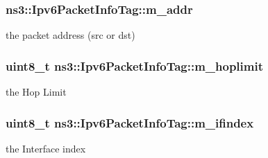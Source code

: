 \subsubsection[{\texorpdfstring{m\+\_\+addr}{m_addr}}]{ ns3\+::\+Ipv6\+Packet\+Info\+Tag\+::m\+\_\+addr\hspace{0.3cm}{\ttfamily [private]}}\hypertarget{classns3_1_1Ipv6PacketInfoTag_a483b85ae4e7fa24395b53ed02b36c646}{}\label{classns3_1_1Ipv6PacketInfoTag_a483b85ae4e7fa24395b53ed02b36c646}


the packet address (src or dst) 

\subsubsection[{\texorpdfstring{m\+\_\+hoplimit}{m_hoplimit}}]{\setlength{\rightskip}{0pt plus 5cm}uint8\+\_\+t ns3\+::\+Ipv6\+Packet\+Info\+Tag\+::m\+\_\+hoplimit\hspace{0.3cm}{\ttfamily [private]}}\hypertarget{classns3_1_1Ipv6PacketInfoTag_acf8109982da2ac881894047f6b14e30d}{}\label{classns3_1_1Ipv6PacketInfoTag_acf8109982da2ac881894047f6b14e30d}


the Hop Limit 

\subsubsection[{\texorpdfstring{m\+\_\+ifindex}{m_ifindex}}]{\setlength{\rightskip}{0pt plus 5cm}uint8\+\_\+t ns3\+::\+Ipv6\+Packet\+Info\+Tag\+::m\+\_\+ifindex\hspace{0.3cm}{\ttfamily [private]}}\hypertarget{classns3_1_1Ipv6PacketInfoTag_a9093a526d9b0ac774a0d1de1805a23f7}{}\label{classns3_1_1Ipv6PacketInfoTag_a9093a526d9b0ac774a0d1de1805a23f7}


the Interface index 

